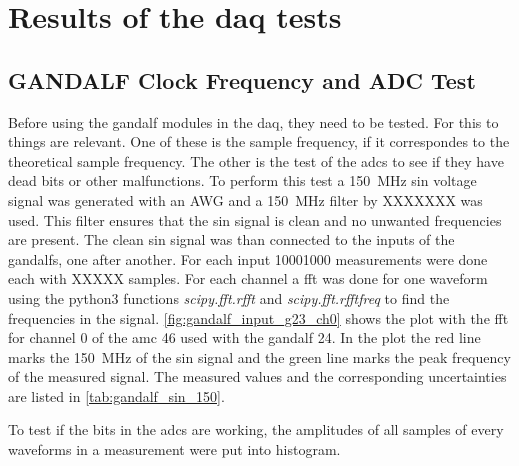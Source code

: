 \chapter{Results of the \ac{daq} tests}


\section{GANDALF Clock Frequency and ADC Test}
Before using the \ac{gandalf} modules in the \ac{daq}, they need to be tested.
For this to things are relevant.
One of these is the sample frequency, if it correspondes to the theoretical sample frequency.
The other is the test of the \acp{adc} to see if they have dead bits or other malfunctions.
To perform this test a \SI{150}{\mega\hertz} sin voltage signal was generated with an AWG and a \SI{150}{\mega\hertz} filter by XXXXXXX was used.
This filter ensures that the sin signal is clean and no unwanted frequencies are present.
The clean sin signal was than connected to the inputs of the \acp{gandalf}, one after another.
For each input \num{1000}1000 measurements were done each with XXXXX samples.
For each channel a \ac{fft} was done for one waveform using the python3 functions \textit{scipy.fft.rfft} and \textit{scipy.fft.rfftfreq} to find the frequencies in the signal.
\autoref{fig:gandalf_input_g23_ch0} shows the plot with the \ac{fft} for channel 0 of the \ac{amc} 46 used with the \ac{gandalf} 24.
In the plot the red line marks the \SI{150}{\mega\hertz} of the sin signal and the green line marks the peak frequency of the measured signal.
The measured values and the corresponding uncertainties are listed in \autoref{tab:gandalf_sin_150}.




To test if the bits in the \acp{adc} are working, the amplitudes of all samples of every waveforms in a measurement were put into histogram.





